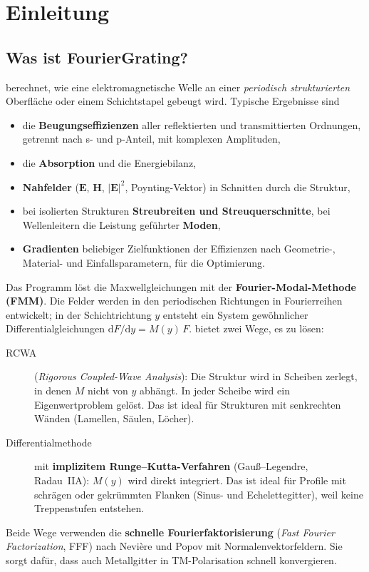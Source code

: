 \chapter{Einleitung}\label{ch:einleitung}

\section{Was ist FourierGrating?}
\FG{} berechnet, wie eine elektromagnetische Welle an einer \emph{periodisch strukturierten} Oberfläche oder
einem Schichtstapel gebeugt wird. Typische Ergebnisse sind
\begin{itemize}
  \item die \textbf{Beugungseffizienzen} aller reflektierten und transmittierten Ordnungen, getrennt nach s- und
        p-Anteil, mit komplexen Amplituden,
  \item die \textbf{Absorption} und die Energiebilanz,
  \item \textbf{Nahfelder} ($\mathbf E$, $\mathbf H$, $|\mathbf E|^2$, Poynting-Vektor) in Schnitten durch die Struktur,
  \item bei isolierten Strukturen \textbf{Streubreiten und Streuquerschnitte}, bei Wellenleitern die Leistung
        geführter \textbf{Moden},
  \item \textbf{Gradienten} beliebiger Zielfunktionen der Effizienzen nach Geometrie-, Material- und
        Einfallsparametern, für die Optimierung.
\end{itemize}

Das Programm löst die Maxwellgleichungen mit der \textbf{Fourier-Modal-Methode (FMM)}. Die Felder werden in den
periodischen Richtungen in Fourierreihen entwickelt; in der Schichtrichtung $y$ entsteht ein System gewöhnlicher
Differentialgleichungen $\mathrm dF/\mathrm dy = M(y)\,F$. \FG{} bietet zwei Wege, es zu lösen:

\begin{description}
  \item[RCWA] (\emph{Rigorous Coupled-Wave Analysis}): Die Struktur wird in Scheiben zerlegt, in denen $M$ nicht von
        $y$ abhängt. In jeder Scheibe wird ein Eigenwertproblem gelöst. Das ist ideal für Strukturen mit senkrechten
        Wänden (Lamellen, Säulen, Löcher).
  \item[Differentialmethode] mit \textbf{implizitem Runge--Kutta-Verfahren} (Gauß--Legendre, Radau~IIA): $M(y)$ wird
        direkt integriert. Das ist ideal für Profile mit schrägen oder gekrümmten Flanken (Sinus- und
        Echelettegitter), weil keine Treppenstufen entstehen.
\end{description}
Beide Wege verwenden die \textbf{schnelle Fourierfaktorisierung} (\emph{Fast Fourier Factorization}, FFF) nach
Nevière und Popov mit Normalenvektorfeldern. Sie sorgt dafür, dass auch Metallgitter in TM-Polarisation schnell
konvergieren.

